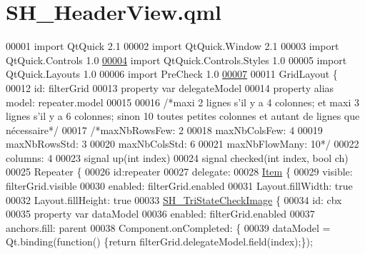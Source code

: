 \hypertarget{SH__HeaderView_8qml}{\section{S\-H\-\_\-\-Header\-View.\-qml}
\label{SH__HeaderView_8qml}
}

\begin{DoxyCode}
00001 \textcolor{keyword}{import} QtQuick 2.1
00002 import QtQuick.Window 2.1
00003 import QtQuick.Controls 1.0
\hypertarget{SH__HeaderView_8qml_source_l00004}{}\hyperlink{classSH__HeaderView}{00004} import QtQuick.Controls.Styles 1.0
00005 import QtQuick.Layouts 1.0
00006 import PreCheck 1.0
\hypertarget{SH__HeaderView_8qml_source_l00007}{}\hyperlink{classSH__HeaderView_a95ec60701e7213acbe17fdc477feb83c}{00007} 
00011 GridLayout \{
00012     \textcolor{keywordtype}{id}: filterGrid
00013     \textcolor{keyword}{property} var delegateModel
00014     \textcolor{keyword}{property} alias model: repeater.model
00015 
00016     \textcolor{comment}{/*maxi 2 lignes s'il y a 4 colonnes; et maxi 3 lignes s'il y a 6 colonnes; sinon 10 toutes petites
       colonnes et autant de lignes que nécessaire*/}
00017     \textcolor{comment}{/*maxNbRowsFew: 2}
00018 \textcolor{comment}{    maxNbColsFew: 4}
00019 \textcolor{comment}{    maxNbRowsStd: 3}
00020 \textcolor{comment}{    maxNbColsStd: 6}
00021 \textcolor{comment}{    maxNbFlowMany: 10*/}
00022     columns: 4
00023     signal up(\textcolor{keywordtype}{int} index)
00024     signal checked(\textcolor{keywordtype}{int} index, \textcolor{keywordtype}{bool} ch)
00025     Repeater \{
00026         \textcolor{keywordtype}{id}:repeater
00027         delegate:
00028             \hyperlink{classItem}{Item} \{
00029             visible: filterGrid.visible
00030             enabled: filterGrid.enabled
00031             Layout.fillWidth: \textcolor{keyword}{true}
00032             Layout.fillHeight: \textcolor{keyword}{true}
00033             \hyperlink{classSH__TriStateCheckImage}{SH\_TriStateCheckImage} \{
00034                 \textcolor{keywordtype}{id}: cbx
00035                 \textcolor{keyword}{property} var dataModel
00036                 enabled: filterGrid.enabled
00037                 anchors.fill: parent
00038                 Component.onCompleted: \{
00039                     dataModel = Qt.binding(\textcolor{keyword}{function}() \{\textcolor{keywordflow}{return} filterGrid.delegateModel.field(index);\});

\end{DoxyCode}
